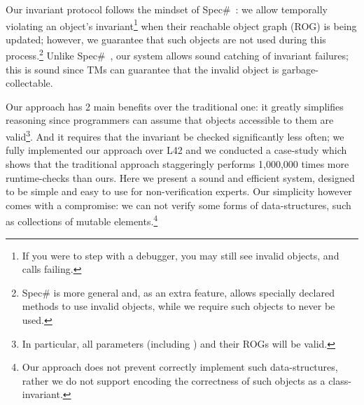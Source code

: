 
Our invariant protocol follows the mindset of Spec\#~\cite{?}: we allow temporally violating an object's invariant\footnote{If you were to step with a debugger, you may still see invalid objects, and \Q@invariant@ calls failing.} when their reachable object graph (ROG) is being updated; however, we guarantee that such objects are not used during this process.\footnote{Spec\# is more general and, as an extra feature, allows specially declared methods to use invalid objects, while we require such objects to never be used.}
Unlike Spec\#~\cite{?}, our system allows sound catching of invariant failures; this is sound since TMs can guarantee that the invalid object is garbage-collectable.

Our approach has 2 main benefits over the traditional one: it greatly simplifies reasoning since programmers can assume that objects accessible to them are valid\footnote{In particular, all parameters (including \Q@this@) and their ROGs will be valid.}. And it requires that the invariant be checked significantly less often; we fully implemented our approach over L42 and we conducted a case-study which shows that the traditional approach staggeringly performs 1,000,000 times more runtime-checks than ours.
Here we present a sound and efficient system, designed to be simple and easy to use for non-verification experts. Our simplicity however comes with a compromise: we can not verify some forms of data-structures, such as collections of mutable elements.\footnote{Our approach does not prevent correctly implement such data-structures, rather we do not support encoding the correctness of such objects as a class-invariant.}

